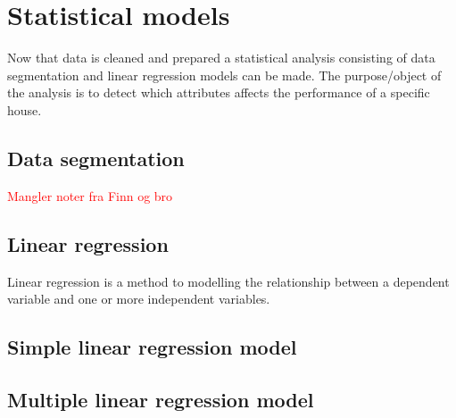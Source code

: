 \chapter{Statistical models}
Now that data is cleaned and prepared a statistical analysis consisting of data segmentation and linear regression models can be made. The purpose/object of the analysis is to detect which attributes affects the performance of a specific house. 

\section{Data segmentation}
\textcolor{red}{Mangler noter fra Finn og bro}

\section{Linear regression}
Linear regression is a method to modelling the relationship between a dependent variable and one or more independent variables.

\section{Simple linear regression model}

\section{Multiple linear regression model}